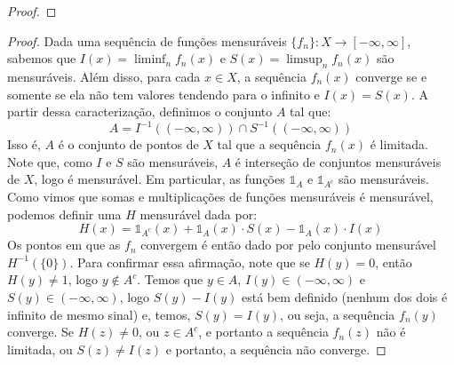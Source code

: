 \begin{proof}
\end{proof}

\prob
\begin{proof}
    Dada uma sequência de funções mensuráveis $\{f_n\} : X \to [-\infty, \infty]$, sabemos que $I(x) = \liminf_n f_n(x)$ e $S(x) = \limsup_n f_n(x)$ são mensuráveis.
    Além disso, para cada $x \in X$, a sequência $f_n(x)$ converge se e somente se ela não tem valores tendendo para o infinito e $I(x) = S(x)$.
    A partir dessa caracterização, definimos o conjunto $A$ tal que:
    $$A = I^{-1}((-\infty, \infty)) \cap S^{-1}((-\infty, \infty))$$
    Isso é, $A$ é o conjunto de pontos de $X$ tal que a sequência $f_n(x)$ é limitada. Note que, como $I$ e $S$ são mensuráveis, $A$ é interseção
    de conjuntos mensuráveis de $X$, logo é mensurável. Em particular, as funções $\mathds{1}_A$ e $\mathds{1}_{A^c}$ são mensuráveis. Como vimos que somas e multiplicações
    de funções mensuráveis é mensurável, podemos definir uma $H$ mensurável dada por:
    $$H(x) = \mathds{1}_{A^c}(x) + \mathds{1}_A(x) \cdot S(x) - \mathds{1}_A(x) \cdot I(x) $$
    Os pontos em que as $f_n$ convergem é então dado por pelo conjunto mensurável $H^{-1}(\{0\})$. Para confirmar essa afirmação, note que
    se $H(y) = 0$, então $H(y) \neq 1$, logo $y \not \in A^c$. Temos que $y \in A$, $I(y) \in (-\infty,\infty)$ e $S(y) \in (-\infty, \infty)$, 
    logo $S(y) - I(y)$ está bem definido (nenhum dos dois é infinito de mesmo sinal) e, temos, $S(y) = I(y)$, ou seja, a sequência $f_n(y)$ converge.
    Se $H(z) \neq 0$, ou $z \in A^c$, e portanto a sequência $f_n(z)$ não é limitada, ou $S(z) \neq I(z)$ e portanto, a sequência não converge.  
\end{proof}

